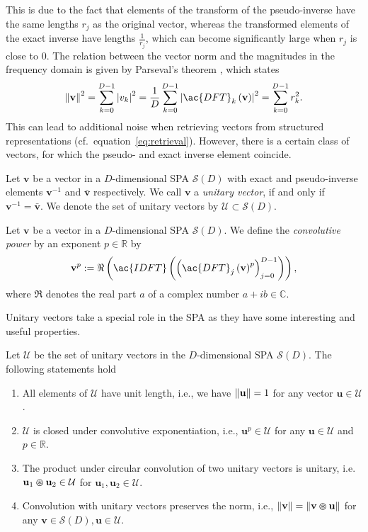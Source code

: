 This is due to the fact that elements of the transform of the pseudo-inverse have the same lengths $r_j$ as the original vector, whereas the transformed elements of the exact inverse have lengths $\frac{1}{r_j}$, which can become significantly large when $r_j$ is close to $0$.
The relation between the vector norm and the magnitudes in the frequency domain is given by Parseval's theorem  \parencite[also known as Rayleigh's theorem, see][Chap. 6]{Bracewell2000}, which states
\begin{equation}
\label{eq:parseval}
\norm{\mathbf{v}}^2 = \sum_{k=0}^{D-1} \left| v_{k} \right|^{2} = \frac{1}{D} \sum_{k=0}^{D-1} \left|\ac{DFT}_{k}\left( \mathbf{v}\right)\right|^{2} = \sum_{k=0}^{D-1} r_{k}^{2}.
\end{equation}
This can lead to additional noise when retrieving vectors from structured representations (cf.\ equation~\eqref{eq:retrieval}).
However, there is a certain class of vectors, for which the pseudo- and exact inverse element coincide.
\begin{defn}
	\label{def:unitary_vec}
	Let $ \mathbf{v}$ be a vector in a $D$-dimensional \ac{SPA} $\mathcal{S}(D)$ with exact and pseudo-inverse elements $ \mathbf{v}^{-1}$ and $\bar{\mathbf{v}}$ respectively.
	We call $ \mathbf{v}$ a \emph{unitary vector}, if and only if $ \mathbf{v}^{-1} = \bar{\mathbf{v}}$.
	We denote the set of unitary vectors by $\mathcal{U} \subset \mathcal{S}(D)$.
\end{defn}
\begin{defn}
	\label{def:conv_power}
	Let $ \mathbf{v}$ be a vector in a $D$-dimensional \ac{SPA} $\mathcal{S}(D)$. We define the \emph{convolutive power} by an exponent $p \in \mathbb{R}$ by
	\[
	\mathbf{v}^{p} := \Re\left(\ac{IDFT} \left(\left(\ac{DFT}_{j}\left( \mathbf{v}\right)^{p}\right)_{j=0}^{D-1}\right)\right),
	\]
	where $\Re$ denotes the real part $a$ of a complex number $a + ib \in \mathbb{C}$.
\end{defn}
Unitary vectors take a special role in the \ac{SPA} as they have some interesting and useful properties.
\begin{lemma}
	\label{lemma:unitary_vec}
	Let $\mathcal{U}$ be the set of unitary vectors in the $D$-dimensional \ac{SPA} $\mathcal{S}(D)$.
    The following statements hold
 	\begin{enumerate}[label=\roman*]
		\item All elements of $\mathcal{U}$ have unit length, i.e., we have $\left\| \mathbf{u} \right\| = 1$ for any vector $ \mathbf{u} \in \mathcal{U}$.
		\item $\mathcal{U}$ is closed under convolutive exponentiation, i.e., $ \mathbf{u}^{p} \in \mathcal{U}$ for any $ \mathbf{u} \in \mathcal{U}$ and $p \in \mathbb{R}$.
        \item The product under circular convolution of two unitary vectors is unitary, i.e.\ $ \mathbf{u}_{1} \varoast \mathbf{u}_{2} \in \mathcal{U} $ for $ \mathbf{u}_{1}, \mathbf{u}_{2} \in \mathcal{U}.$
		\item Convolution with unitary vectors preserves the norm, i.e., $\left\| \mathbf{v} \right\| = \left\|  \mathbf{v} \varoast \mathbf{u} \right\|$ for any $ \mathbf{v} \in \mathcal{S}(D), \mathbf{u} \in \mathcal{U}$.
	\end{enumerate}
\end{lemma}
